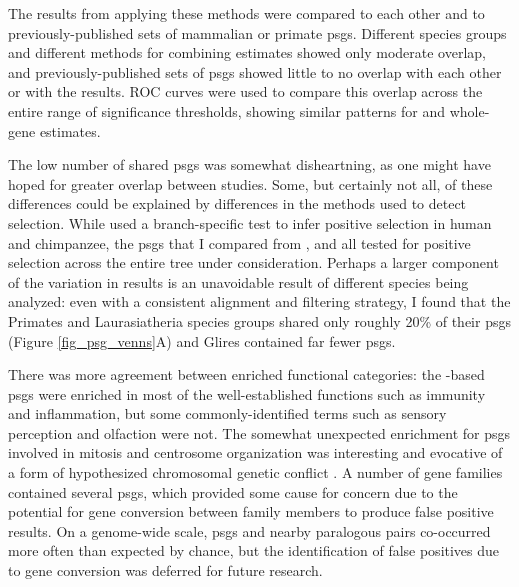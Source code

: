 The results from applying these methods were compared to each other
and to previously-published sets of mammalian or primate
\acfp{psg}. Different species groups and different methods for
combining \sw estimates showed only moderate overlap, and
previously-published sets of \acp{psg} showed little to no overlap
with each other or with the \sw results. ROC curves were used to
compare this overlap across the entire range of significance
thresholds, showing similar patterns for \sw \pvs and whole-gene \dnds
estimates.

The low number of shared \acp{psg} was somewhat disheartning, as one
might have hoped for greater overlap between studies. Some, but
certainly not all, of these differences could be explained by
differences in the methods used to detect selection. While
\citet{Clark2003} used a branch-specific test to infer positive
selection in human and chimpanzee, the \acp{psg} that I compared from
\citet{Nielsen2005}, \citet{Macaque2007} and \citet{Kosiol2008} all
tested for positive selection across the entire tree under
consideration. Perhaps a larger component of the variation in results
is an unavoidable result of different species being analyzed: even
with a consistent alignment and filtering strategy, I found that the
Primates and Laurasiatheria species groups shared only roughly 20\% of
their \acp{psg} (Figure \ref{fig_psg_venns}A) and Glires contained far
fewer \acp{psg}.

There was more agreement between enriched functional categories: the
\sw-based \acp{psg} were enriched in most of the well-established
functions such as immunity and inflammation, but some
commonly-identified terms such as sensory perception and olfaction
were not. The somewhat unexpected enrichment for \acp{psg} involved in
mitosis and centrosome organization was interesting and evocative of a
form of hypothesized chromosomal genetic conflict \citep{Malik2002}. A
number of gene families contained several \acp{psg}, which provided
some cause for concern due to the potential for gene conversion
between family members to produce false positive results. On a
genome-wide scale, \acp{psg} and nearby paralogous pairs co-occurred
more often than expected by chance, but the identification of false
positives due to gene conversion was deferred for future research.

